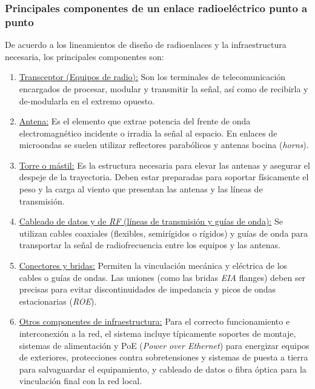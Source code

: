 \subsubsection{Principales componentes de un enlace radioeléctrico punto a punto}
\label{sec_2.1.1}
De acuerdo a los lineamientos de diseño de radioenlaces y la infraestructura necesaria, los principales componentes son:
\begin{enumerate}
    \item \underline{Transceptor (Equipos de radio):} Son los terminales de telecomunicación encargados de procesar, modular y transmitir la señal, así como de recibirla y de-modularla en el extremo opuesto.
    \item \underline{Antena:} Es el elemento que extrae potencia del frente de onda electromagnético incidente o irradia la señal al espacio. En enlaces de microondas se suelen utilizar reflectores parabólicos y antenas bocina (\textit{horns}).
    \item \underline{Torre o mástil:} Es la estructura necesaria para elevar las antenas y asegurar el despeje de la trayectoria. Deben estar preparadas para soportar físicamente el peso y la carga al viento que presentan las antenas y las líneas de transmisión.
    \item \underline{Cableado de datos y de \textit{RF} (líneas de transmisión y guías de onda):} Se utilizan cables coaxiales (flexibles, semirígidos o rígidos) y guías de onda para transportar la señal de radiofrecuencia entre los equipos y las antenas.
    \item \underline{Conectores y bridas:} Permiten la vinculación mecánica y eléctrica de los cables o guías de ondas. Las uniones (como las bridas \textit{EIA} flanges) deben ser precisas para evitar discontinuidades de impedancia y picos de ondas estacionarias (\textit{ROE}).
    \item \underline{Otros componentes de infraestructura:} Para el correcto funcionamiento e interconexión a la red, el sistema incluye típicamente soportes de montaje, sistemas de alimentación y PoE (\textit{Power over Ethernet}) para energizar equipos de exteriores, protecciones contra sobretensiones y sistemas de puesta a tierra para salvaguardar el equipamiento, y cableado de datos o fibra óptica para la vinculación final con la red local.  \cite{b1}
\end{enumerate}


